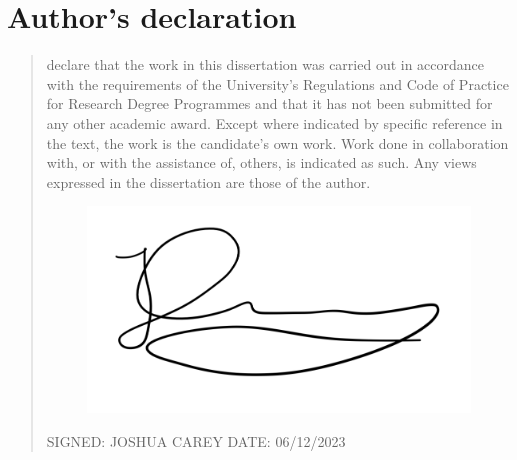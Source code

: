 \chapter*{Author's declaration}
\begin{SingleSpace}
\begin{quote}
 declare that the work in this dissertation was carried out in accordance with the requirements of  the University's Regulations and Code of Practice for Research Degree Programmes and that it  has not been submitted for any other academic award. Except where indicated by specific  reference in the text, the work is the candidate's own work. Work done in collaboration with, or with the assistance of, others, is indicated as such. Any views expressed in the dissertation are those of the author.

\begin{figure}[!ht]
    \centering
    \includegraphics[scale=0.2]{Images/Consumer and manufacturer research.png}
\end{figure}

\vspace{1.5cm}
\noindent
\hspace{-0.75cm}\textsc{SIGNED: JOSHUA CAREY}
\newline
\newline
\textsc{DATE: 06/12/2023}
\end{quote}
\end{SingleSpace}
\clearpage